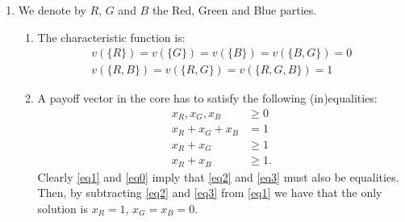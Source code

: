 \documentclass[11pt]{article} \usepackage{amssymb}
\newtheorem*{theorem*}{Theorem}
\begin{document}
\begin{enumerate}
\begin{enumerate}
    {\bf Proof of the first direction of the Shapely-Bondareva theorem.}
    \begin{theorem*}[Shapely - Bondareva]
      If $C(v) \neq \emptyset$ then for every balanced collection
      $\{S_1,\ldots,S_k\}$ with balancing weights $\{\lambda_i\}$ it
      holds that $\sum_{i=1}^k\lambda_iv(S_i) \leq v(N)$.
    \end{theorem*}
    \begin{proof}
      Let $x$ be in the core of $v$, and let $\{S_1,\ldots,S_k\}$ be a
      balanced collection with balancing weights $\{\lambda_i\}$. Then
      $\sum_{j \in S_i}x_j \geq v(S_i)$ and so $\lambda_i\sum_{j \in
        S_i}x_j \geq \lambda_iv(S_i)$. We now sum over $i$:
      \begin{align*}
        \sum_{i=1}^k\lambda_iv(S_i) &\leq \sum_{i=1}^k\lambda_i\sum_{j
          \in S_i}x_j
        \\ &= \sum_{i=1}^k\sum_{j \in S_i}\lambda_ix_j
        \\ &= \sum_{i=1}^k\sum_{j}{\bf 1}_{j\in S_i}\lambda_ix_j
        \\ &= \sum_{j}x_j\sum_{i=1}^k{\bf 1}_{j\in S_i}\lambda_i
        \\ &= \sum_{j}x_j\sum_{i: j \in S_i}^k\lambda_i
        \\ &= \sum_{j}x_j
        \\ &\leq v(N)
      \end{align*}
    \end{proof}
  \item We denote by $R$, $G$ and $B$ the Red, Green and Blue
      parties. 
    \begin{enumerate}
    \item 
      The characteristic function is:
      \begin{align*}
        v(\{R\}) = v(\{G\}) = v(\{B\}) = v(\{B, G\}) = 0
        \\ v(\{R, B\}) = v(\{R, G\}) = v(\{R, G, B\}) = 1
      \end{align*}

    \item
      A payoff vector in the core has to satisfy the following
      (in)equalities:
      \begin{align}
        x_R,x_G,x_B &\geq 0 \label{eq0}
        \\ x_R+x_G+x_B &= 1 \label{eq1}
        \\ x_R+x_G &\geq 1 \label{eq2}
        \\ x_R+x_B &\geq 1. \label{eq3}
      \end{align}
      Clearly \eqref{eq1} and \eqref{eq0} imply that \eqref{eq2} and
      \eqref{eq3} must also be equalities. Then, by subtracting
      \eqref{eq2} and \eqref{eq3} from \eqref{eq1} we have that the
      only solution is $x_R=1$, $x_G=x_B=0$.


\end{enumerate}
\end{enumerate}
\end{enumerate}
\end{document}
